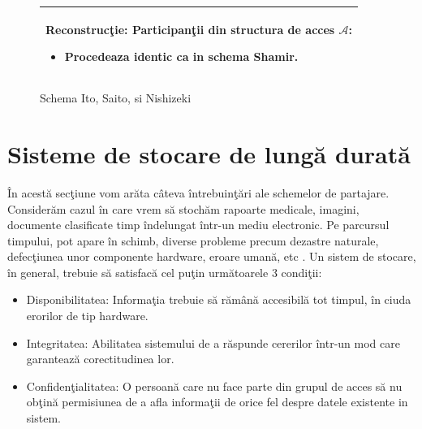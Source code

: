 \documentclass{llncs}
\begin{document}
\begin{figure}[h!]
\begin{tabular}{|p{\textwidth}|}
\hspace{.1in}
\textbf{Reconstruc\c{t}ie}: Participan\c{t}ii din structura de acces $\mathcal{A}$:
	\begin{itemize}
		\item Procedeaza identic ca in schema Shamir.
	\end{itemize}


\\
\hline
\end{tabular}

\caption{Schema Ito, Saito, si Nishizeki \cite{ITO:1989}}
\label{fig:ito_et_al}
\end{figure}





\section{Sisteme de stocare de lung\u{a} durat\u{a}}
\label{sec:long_term_systems_intro}
\^{I}n acest\u{a} sec\c{t}iune vom ar\u{a}ta c\^{a}teva \^{i}ntrebuin\c{t}\u{a}ri ale schemelor de partajare. Consider\u{a}m cazul \^{i}n care vrem s\u{a} stoch\u{a}m rapoarte medicale, imagini, documente clasificate timp \^{i}ndelungat \^{i}ntr-un mediu electronic. Pe parcursul timpului, pot apare \^{i}n schimb, diverse probleme precum dezastre naturale, defec\c{t}iunea unor componente hardware, eroare uman\u{a}, etc \cite{SGMV:2009}.
Un sistem de stocare, \^{i}n general, trebuie s\u{a} satisfac\u{a} cel pu\c{t}in urm\u{a}toarele 3 condi\c{t}ii:
\begin{itemize}
	\item Disponibilitatea: Informa\c{t}ia trebuie s\u{a} r\u{a}m\^{a}n\u{a} accesibil\u{a} tot timpul, \^{i}n ciuda erorilor de tip hardware.
	\item Integritatea: Abilitatea sistemului de a r\u{a}spunde cererilor \^{i}ntr-un mod care garanteaz\u{a} corectitudinea lor.
	\item Confiden\c{t}ialitatea: O persoan\u{a} care nu face parte din grupul de acces s\u{a} nu ob\c{t}in\u{a} permisiunea de a afla informa\c{t}ii de orice fel despre datele existente in sistem.
\end{itemize}
\end{document}
